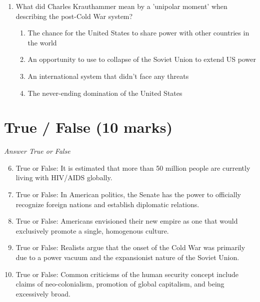 \documentclass[12pt]{article}
\begin{document}
\begin{enumerate}[label=\arabic*.]
\begin{enumerate}[label=(\alph*)]
    \item the Chamber of Deputies.
    \item the Council of Ministers.
    \item the Secretariat.
\end{enumerate}
\item What did Charles Krauthammer mean by a 'unipolar moment' when describing the post-Cold War system?
\begin{enumerate}[label=(\alph*)]
    \item The chance for the United States to share power with other countries in the world
    \item An opportunity to use to collapse of the Soviet Union to extend US power
    \item An international system that didn't face any threats
    \item The never-ending domination of the United States
\end{enumerate}
\end{enumerate}

\section*{True / False (10 marks)}
\textit{Answer True or False}
\begin{enumerate}[label=\arabic*.]
\setcounter{enumi}{5}
\item True or False: It is estimated that more than 50 million people are currently living with HIV/AIDS globally.
\item True or False: In American politics, the Senate has the power to officially recognize foreign nations and establish diplomatic relations.
\item True or False: Americans envisioned their new empire as one that would exclusively promote a single, homogenous culture.
\item True or False: Realists argue that the onset of the Cold War was primarily due to a power vacuum and the expansionist nature of the Soviet Union.
\item True or False: Common criticisms of the human security concept include claims of neo-colonialism, promotion of global capitalism, and being excessively broad.
\end{enumerate}
\end{document}

